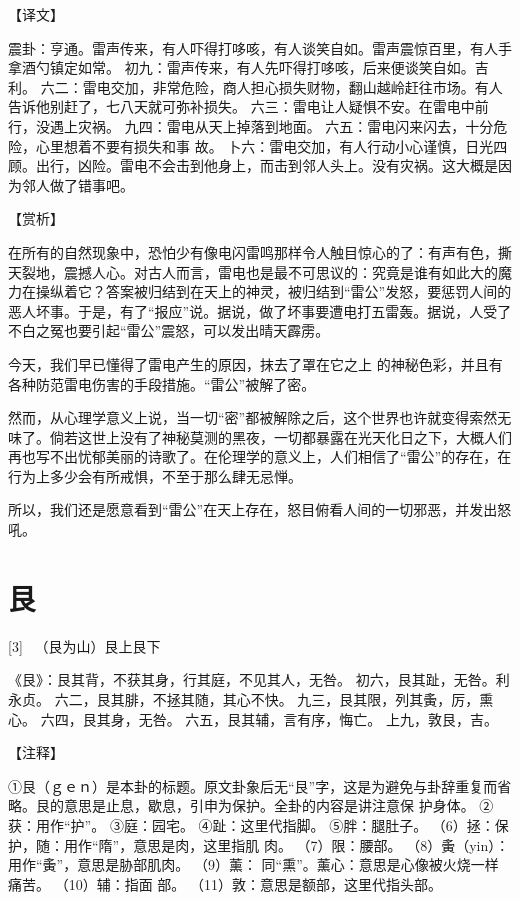 \documentclass[12pt,UTF8]{ctexbook}
\begin{document}
【译文】

震卦：亨通。雷声传来，有人吓得打哆咳，有人谈笑自如。雷声震惊百里，有人手拿酒勺镇定如常。
初九：雷声传来，有人先吓得打哆咳，后来便谈笑自如。吉利。
六二：雷电交加，非常危险，商人担心损失财物，翻山越岭赶往市场。有人告诉他别赶了，七八天就可弥补损失。
六三：雷电让人疑惧不安。在雷电中前行，没遇上灾祸。
九四：雷电从天上掉落到地面。 六五：雷电闪来闪去，十分危险，心里想着不要有损失和事 故。
卜六：雷电交加，有人行动小心谨慎，日光四顾。出行，凶险。雷电不会击到他身上，而击到邻人头上。没有灾祸。这大概是因为邻人做了错事吧。

【赏析】

在所有的自然现象中，恐怕少有像电闪雷鸣那样令人触目惊心的了：有声有色，撕天裂地，震撼人心。对古人而言，雷电也是最不可思议的：究竟是谁有如此大的魔力在操纵着它？答案被归结到在天上的神灵，被归结到“雷公”发怒，要惩罚人间的恶人坏事。于是，有了“报应”说。据说，做了坏事要遭电打五雷轰。据说，人受了不白之冤也要引起“雷公”震怒，可以发出晴天霹雳。

今天，我们早已懂得了雷电产生的原因，抹去了罩在它之上 的神秘色彩，并且有各种防范雷电伤害的手段措施。“雷公”被解了密。

然而，从心理学意义上说，当一切“密”都被解除之后，这个世界也许就变得索然无味了。倘若这世上没有了神秘莫测的黑夜，一切都暴露在光天化日之下，大概人们再也写不出忧郁美丽的诗歌了。在伦理学的意义上，人们相信了“雷公”的存在，在行为上多少会有所戒惧，不至于那么肆无忌惮。

所以，我们还是愿意看到“雷公”在天上存在，怒目俯看人间的一切邪恶，并发出怒吼。

\chapter{艮}

[3] \ （艮为山）艮上艮下

《艮》：艮其背，不获其身，行其庭，不见其人，无咎。
初六，艮其趾，无咎。利永贞。
六二，艮其腓，不拯其随，其心不快。
九三，艮其限，列其夤，厉，熏心。
六四，艮其身，无咎。
六五，艮其辅，言有序，悔亡。
上九，敦艮，吉。

【注释】

①艮（ｇｅｎ）是本卦的标题。原文卦象后无“艮”字，这是为避免与卦辞重复而省略。艮的意思是止息，歇息，引申为保护。全卦的内容是讲注意保 护身体。
②获：用作“护”。
③庭：园宅。
④趾：这里代指脚。
⑤胖：腿肚子。
（6）拯：保护，随：用作“隋”，意思是肉，这里指肌 肉。
（7）限：腰部。
（8）夤（yin）：用作“夤”，意思是胁部肌肉。
（9）薰： 同“熏”。薰心：意思是心像被火烧一样痛苦。
（10）辅：指面 部。
（11）敦：意思是额部，这里代指头部。
\end{document}
